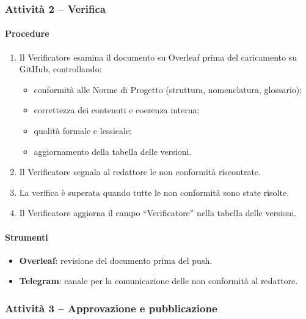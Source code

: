 \documentclass[a4paper, 11pt, oneside]{scrartcl}
\begin{document}
\subsubsection{Attività 2 – Verifica}

\paragraph{Procedure}
\begin{enumerate}
    \item Il Verificatore esamina il documento su Overleaf prima del caricamento su GitHub, controllando:
          \begin{itemize}
              \item conformità alle Norme di Progetto (struttura, nomenclatura, glossario);
              \item correttezza dei contenuti e coerenza interna;
              \item qualità formale e lessicale;
              \item aggiornamento della tabella delle versioni.
          \end{itemize}
    \item Il Verificatore segnala al redattore le non conformità riscontrate.
    \item La verifica è superata quando tutte le non conformità sono state risolte.
    \item Il Verificatore aggiorna il campo ``Verificatore'' nella tabella delle versioni.
\end{enumerate}

\paragraph{Strumenti}
\begin{itemize}
    \item \textbf{Overleaf}: revisione del documento prima del push.
    \item \textbf{Telegram}: canale per la comunicazione delle non conformità al redattore.
\end{itemize}

\subsubsection{Attività 3 – Approvazione e pubblicazione}
\end{document}
